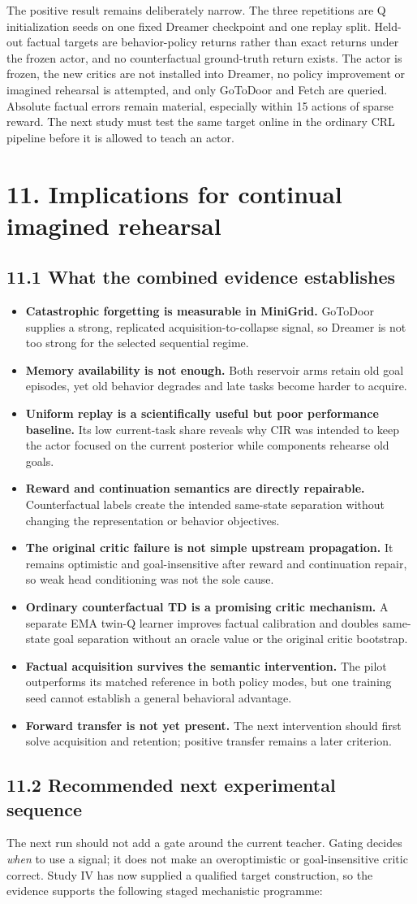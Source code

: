 \documentclass[10pt,a4paper]{article}
\newcommand{\reportsection}[1]{\section{#1}}
\newcommand{\reportsubsection}[1]{\subsection{\textcolor{brandblue}{#1}}}
\begin{document}
The positive result remains deliberately narrow. The three repetitions are Q initialization seeds on one fixed Dreamer checkpoint and one replay split. Held-out factual targets are behavior-policy returns rather than exact returns under the frozen actor, and no counterfactual ground-truth return exists. The actor is frozen, the new critics are not installed into Dreamer, no policy improvement or imagined rehearsal is attempted, and only GoToDoor and Fetch are queried. Absolute factual errors remain material, especially within 15 actions of sparse reward. The next study must test the same target online in the ordinary CRL pipeline before it is allowed to teach an actor.

\reportsection{11. Implications for continual imagined rehearsal}
\reportsubsection{11.1 What the combined evidence establishes}
\begin{itemize}
\item \textbf{Catastrophic forgetting is measurable in MiniGrid.} GoToDoor supplies a strong, replicated acquisition-to-collapse signal, so Dreamer is not too strong for the selected sequential regime.
\item \textbf{Memory availability is not enough.} Both reservoir arms retain old goal episodes, yet old behavior degrades and late tasks become harder to acquire.
\item \textbf{Uniform replay is a scientifically useful but poor performance baseline.} Its low current-task share reveals why CIR was intended to keep the actor focused on the current posterior while components rehearse old goals.
\item \textbf{Reward and continuation semantics are directly repairable.} Counterfactual labels create the intended same-state separation without changing the representation or behavior objectives.
\item \textbf{The original critic failure is not simple upstream propagation.} It remains optimistic and goal-insensitive after reward and continuation repair, so weak head conditioning was not the sole cause.
\item \textbf{Ordinary counterfactual TD is a promising critic mechanism.} A separate EMA twin-Q learner improves factual calibration and doubles same-state goal separation without an oracle value or the original critic bootstrap.
\item \textbf{Factual acquisition survives the semantic intervention.} The pilot outperforms its matched reference in both policy modes, but one training seed cannot establish a general behavioral advantage.
\item \textbf{Forward transfer is not yet present.} The next intervention should first solve acquisition and retention; positive transfer remains a later criterion.
\end{itemize}
\reportsubsection{11.2 Recommended next experimental sequence}
The next run should not add a gate around the current teacher. Gating decides \emph{when} to use a signal; it does not make an overoptimistic or goal-insensitive critic correct. Study IV has now supplied a qualified target construction, so the evidence supports the following staged mechanistic programme:
\end{document}
